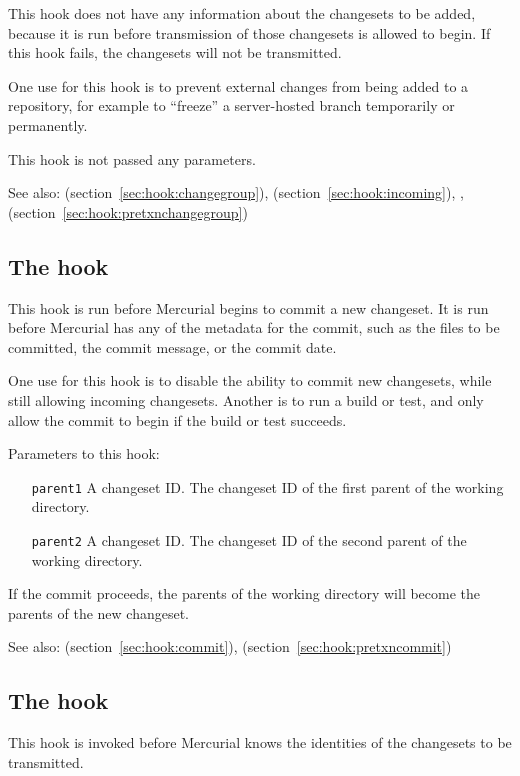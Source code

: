 This hook does not have any information about the changesets to be
added, because it is run before transmission of those changesets is
allowed to begin.  If this hook fails, the changesets will not be
transmitted.

One use for this hook is to prevent external changes from being added
to a repository, for example to ``freeze'' a server-hosted branch
temporarily or permanently.

This hook is not passed any parameters.

See also:  (section~\ref{sec:hook:changegroup}),
 (section~\ref{sec:hook:incoming}), ,
 (section~\ref{sec:hook:pretxnchangegroup})

\subsection{The  hook}
\label{sec:hook:precommit}

This hook is run before Mercurial begins to commit a new changeset.
It is run before Mercurial has any of the metadata for the commit,
such as the files to be committed, the commit message, or the commit
date.

One use for this hook is to disable the ability to commit new
changesets, while still allowing incoming changesets.  Another is to
run a build or test, and only allow the commit to begin if the build
or test succeeds.

Parameters to this hook:
\begin{itemize}
\item[\texttt{parent1}] A changeset ID.  The changeset ID of the first
  parent of the working directory.
\item[\texttt{parent2}] A changeset ID.  The changeset ID of the second
  parent of the working directory.
\end{itemize}
If the commit proceeds, the parents of the working directory will
become the parents of the new changeset.

See also:  (section~\ref{sec:hook:commit}),
 (section~\ref{sec:hook:pretxncommit})

\subsection{The  hook}
\label{sec:hook:preoutgoing}

This hook is invoked before Mercurial knows the identities of the
changesets to be transmitted.

